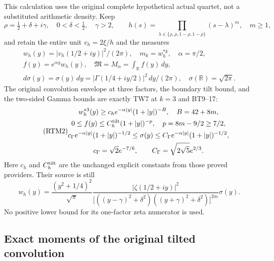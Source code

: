 This calculation uses the original complete hypothetical actual quartet,
not a substituted arithmetic density.  Keep
\[
 \rho=\tfrac12+\delta+i\gamma,\quad0<\delta<\tfrac12,\quad\gamma>2,
 \qquad h(s)=\prod_{\lambda\in\{\rho,\bar\rho,1-\rho,1-\bar\rho\}}
 (s-\lambda)^m,\quad m\ge1,
\]
and retain the entire unit $v_h=2\xi/h$ and the measures
\begin{equation}\tag{RTM1}
 \begin{gathered}
 w_h(y)=|v_h(1/2+iy)|^2/(2\pi),\quad m_k=w_h^{*k},\quad
 \alpha=\pi/2,\\ f(y)=e^{\alpha y}w_h(y),\quad
 \mathfrak M=M_\alpha=\int_{\mathbb R}f(y)\,dy,\\
 d\sigma(y)=\sigma(y)\,dy
 =|\Gamma(1/4+iy/2)|^2\,dy/(2\pi),\quad
 \sigma(\mathbb R)=\sqrt{2\pi}.
 \end{gathered}
\end{equation}
The original convolution envelope at three factors, the boundary tilt
bound, and the two-sided Gamma bounds are exactly TW7 at $k=3$ and
BT9--17:
\begin{equation}\tag{RTM2}
 \begin{gathered}
 w_h^{*3}(y)\ge c_h e^{-\alpha|y|}(1+|y|)^{-B},\quad B=42+8m,\\
 0\le f(y)\le C_h^{\rm tilt}(1+|y|)^{-p},\quad p=8m-9/2\ge7/2,\\
 c_\Gamma e^{-\alpha|y|}(1+|y|)^{-1/2}
 \le\sigma(y)\le C_\Gamma e^{-\alpha|y|}(1+|y|)^{-1/2},\\
 c_\Gamma=\sqrt2e^{-7/6},\qquad
 C_\Gamma=\sqrt{2\sqrt5}e^{2/3}.
 \end{gathered}
\end{equation}
Here $c_h$ and $C_h^{\rm tilt}$ are the unchanged explicit constants
from those proved providers.  Their source is still
\[
 w_h(y)=\frac{(y^2+1/4)^2}{\sqrt\pi}
 \frac{|\zeta(1/2+iy)|^2}
 {\bigl[((y-\gamma)^2+\delta^2)((y+\gamma)^2+\delta^2)\bigr]^{2m}}
 \sigma(y).
\]
No positive lower bound for its one-factor zeta numerator is used.

\subsection{Exact moments of the original tilted convolution}

